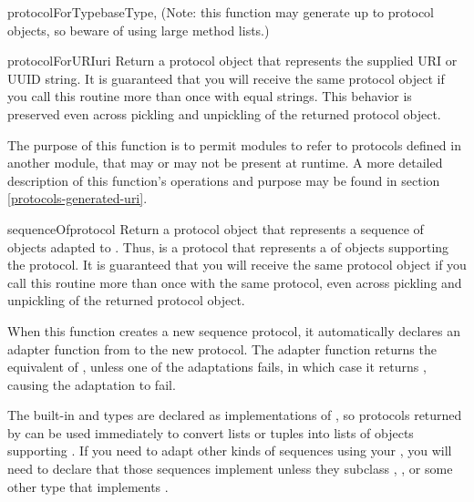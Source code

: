 \begin{verbatim%
}
\begin{verbatim%
}
\begin{verbatim%
}
\begin{verbatim%
}
\begin{verbatim%
}
\begin{verbatim%
}
\begin{funcdesc}{protocolForType}{baseType,
}
(Note: this function may generate up to  protocol
objects, so beware of using large method lists.)
\end{funcdesc}






\begin{funcdesc}{protocolForURI}{uri} 
Return a protocol object that represents the supplied URI or UUID string.  It
is guaranteed that you will receive the same protocol object if you call this
routine more than once with equal strings.  This behavior is preserved even
across pickling and unpickling of the returned protocol object.

The purpose of this function is to permit modules to refer to protocols defined
in another module, that may or may not be present at runtime.  A more detailed
description of this function's operations and purpose may be found in
section \ref{protocols-generated-uri}.
\end{funcdesc}

\begin{funcdesc}{sequenceOf}{protocol} 
Return a protocol object that represents a sequence of objects adapted to
.  Thus,  is a protocol that
represents a  of objects supporting the
 protocol.  It is guaranteed that you will receive the same protocol
object if you call this routine more than once with the same protocol, even
across pickling and unpickling of the returned protocol object.

When this function creates a new sequence protocol, it automatically declares
an adapter function from  to the new protocol.
The adapter function returns the equivalent of , unless one of the adaptations fails, in which case it returns
, causing the adaptation to fail.

The built-in  and  types are declared as
implementations of , so protocols returned by
 can be used immediately to convert lists or tuples into
lists of objects supporting .  If you need to adapt other kinds
of sequences using your , you will need to declare
that those sequences implement  unless they
subclass , , or some other type that implements
.
\end{funcdesc}







\end{verbatim%
}
\end{verbatim%
}
\end{verbatim%
}
\end{verbatim%
}
\end{verbatim%
}
\end{verbatim%
}

